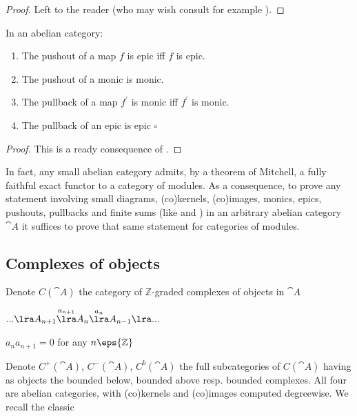 \begin{proof}
Left to the reader (who may wish consult for example \cite{Freyd1}).
\end{proof}

\begin{lem}
\label{lem:pushabelian2}
In an abelian category:
\begin{enumerate}
\item
The pushout of a map $f$ is epic iff $f$ is epic.
\item
The pushout of a monic is monic.
\item
The pullback of a map $f^{'}$ is monic iff $f^{'}$ is monic.
\item
The pullback of an epic is epic $\square$
\end{enumerate}
\end{lem}


\begin{proof}
This is a ready consequence of .
\end{proof}

In fact, any small abelian category admits, by a theorem of Mitchell, a fully faithful exact functor to a category of modules. As a consequence, to prove any statement involving small diagrams, (co)kernels, (co)images, monics, epics, pushouts, pullbacks and finite sums (like  and ) in an arbitrary abelian category ${\cat A}$ it suffices to prove that same statement for categories of modules.

\subsection*{Complexes of objects}
Denote $C({\cat A})$ the category of $\mathbb{Z}$-graded complexes of objects in ${\cat A}$ 
\begin{center}
$... \lra A_{n+1} \overset{a_{n+1}}{\lra} A_n \overset{a_{n}}{\lra} A_{n-1} \lra ...$

$a_n a_{n+1} = 0$ for any $n \eps {\mathbb Z}$
\end{center}
Denote $C^+({\cat A})$, $C^-({\cat A})$, $C^b({\cat A})$ the full subcategories of $C({\cat A})$ having as objects the bounded below, bounded above resp. bounded complexes. All four are abelian categories, with (co)kernels and (co)images computed degreewise. We recall the classic

